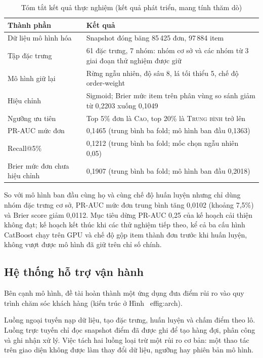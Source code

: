 \documentclass[12pt,a4paper]{report}
\begin{document}
\begin{table}[htbp]\centering\small
\caption{Tóm tắt kết quả thực nghiệm (kết quả phát triển, mang tính thăm dò)}\label{tab:res-summary}
\begin{tabular}{L{3.6cm}L{9.9cm}}
\toprule
Thành phần & Kết quả \\
\midrule
Dữ liệu mô hình hóa & Snapshot đóng băng 85\,425 đơn, 97\,884 item \\
Tập đặc trưng & 61 đặc trưng, 7 nhóm: nhóm cơ sở và các nhóm từ 3 giai đoạn thử nghiệm được giữ \\
Mô hình giữ lại & Rừng ngẫu nhiên, độ sâu 8, lá tối thiểu 5, chế độ order-weight \\
Hiệu chỉnh & Sigmoid; Brier mức item trên phân vùng so sánh giảm từ 0,2203 xuống 0,1049 \\
Ngưỡng ưu tiên & Top 5\% đơn là \textsc{Cao}, top 20\% là \textsc{Trung bình} trở lên \\
PR-AUC mức đơn & 0,1465 (trung bình ba fold; mô hình ban đầu 0,1363) \\
Recall@5\% & 0,1212 (trung bình ba fold; mốc chọn ngẫu nhiên 0,05) \\
Brier mức đơn chưa hiệu chỉnh & 0,1907 (trung bình ba fold; mô hình ban đầu 0,2018) \\
\bottomrule
\end{tabular}
\end{table}

So với mô hình ban đầu cùng họ và cùng chế độ huấn luyện nhưng chỉ dùng nhóm đặc trưng cơ sở, PR-AUC mức đơn trung bình tăng 0,0102 (khoảng 7,5\%) và Brier score giảm 0,0112. Mục tiêu dừng PR-AUC 0,25 của kế hoạch cải thiện không đạt; kế hoạch kết thúc khi các thử nghiệm tiếp theo, kể cả ba cấu hình CatBoost chạy trên GPU và chế độ gộp item thành đơn trước khi huấn luyện, không vượt được mô hình đã giữ trên chỉ số chính.

\subsection{Hệ thống hỗ trợ vận hành}\label{sec:system-api}

Bên cạnh mô hình, đề tài hoàn thành một ứng dụng đưa điểm rủi ro vào quy trình chăm sóc khách hàng (kiến trúc ở Hình~
ef{fig:arch}).

Luồng ngoại tuyến nạp dữ liệu, tạo đặc trưng, huấn luyện và chấm điểm theo lô. Luồng trực tuyến chỉ đọc snapshot điểm đã được ghi để tạo hàng đợi, phân công và ghi nhận xử lý. Việc tách hai luồng loại trừ một rủi ro cơ bản: một thao tác trên giao diện không được làm thay đổi dữ liệu, ngưỡng hay phiên bản mô hình.
\end{document}
